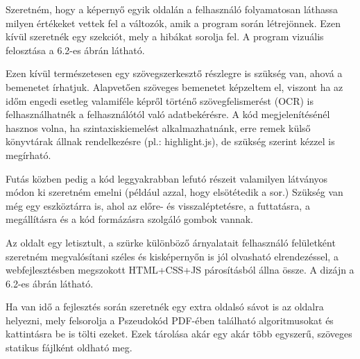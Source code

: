 Szeretném, hogy a képernyő egyik oldalán a felhasználó folyamatosan láthassa milyen értékeket vettek fel a változók, amik a program során létrejönnek. Ezen kívül szeretnék egy szekciót, mely a hibákat sorolja fel. A program vizuális felosztása a 6.2-es ábrán látható.

Ezen kívül természetesen egy szövegszerkesztő részlegre is szükség van, ahová a bemenetet írhatjuk. Alapvetően szöveges bemenetet képzeltem el, viszont ha az időm engedi esetleg valamiféle képről történő szövegfelismerést (OCR) is felhasználhatnék a felhasználótól való adatbekérésre. A kód megjelenítésénél hasznos volna, ha szintaxiskiemelést alkalmazhatnánk, erre remek külső könyvtárak állnak rendelkezésre (pl.: highlight.js), de szükség szerint kézzel is megírható.

Futás közben pedig a kód leggyakrabban lefutó részeit valamilyen látványos módon ki szeretném emelni (például azzal, hogy elsötétedik a sor.) Szükség van még egy eszköztárra is, ahol az előre- és visszaléptetésre, a futtatásra, a megállításra és a kód formázásra szolgáló gombok vannak.

Az oldalt egy letisztult, a szürke különböző árnyalatait felhasználó felületként szeretném megvalósítani széles és kisképernyőn is jól olvasható elrendezéssel, a webfejlesztésben megszokott HTML+CSS+JS párosításból állna össze. A dizájn a 6.2-es ábrán látható.

Ha van idő a fejlesztés során szeretnék egy extra oldalsó sávot is az oldalra helyezni, mely felsorolja a Pszeudokód PDF-ében található algoritmusokat és kattintásra be is tölti ezeket. Ezek tárolása akár egy akár több egyszerű, szöveges statikus fájlként oldható meg.